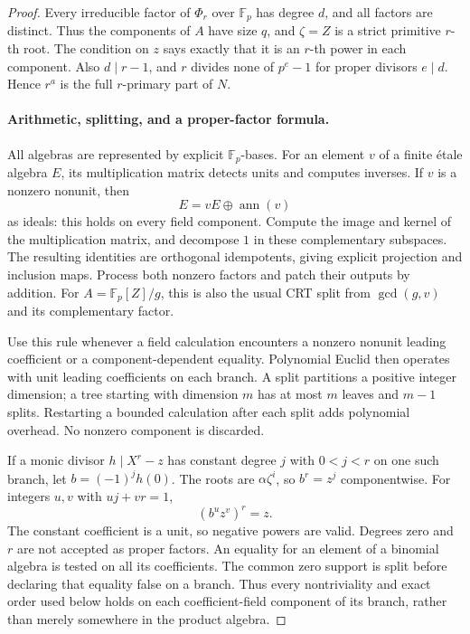 \documentclass[11pt]{article}
\theoremstyle{definition}
\theoremstyle{remark}
\begin{document}
\begin{proof}
Every irreducible factor of \(\Phi_r\) over \(\mathbb F_p\)
has degree \(d\), and all factors are distinct. Thus the components
of \(A\) have size \(q\), and \(\zeta=Z\) is a strict
primitive \(r\)-th root. The condition on \(z\) says exactly that
it is an \(r\)-th power in each component. Also
\(d\mid r-1\), and \(r\) divides none of \(p^e-1\) for
proper divisors \(e\mid d\). Hence \(r^a\) is the full
\(r\)-primary part of \(N\).

\paragraph{Arithmetic, splitting, and a proper-factor formula.}
All algebras are represented by explicit \(\mathbb F_p\)-bases.
For an element \(v\) of a finite \'etale algebra \(E\),
its multiplication matrix detects units and computes inverses.
If \(v\) is a nonzero nonunit, then
\[
                  E=vE\oplus\operatorname{ann}(v)
\]
as ideals: this holds on every field component. Compute the image
and kernel of the multiplication matrix, and decompose \(1\) in
these complementary subspaces. The resulting identities are
orthogonal idempotents, giving explicit projection and inclusion
maps. Process both nonzero factors and patch their outputs by
addition. For \(A=\mathbb F_p[Z]/g\), this is also the usual CRT
split from \(\gcd(g,v)\) and its complementary factor.

Use this rule whenever a field calculation encounters a nonzero
nonunit leading coefficient or a component-dependent equality.
Polynomial Euclid then operates with unit leading coefficients on
each branch. A split partitions a positive integer dimension;
a tree starting with dimension \(m\) has at most \(m\) leaves
and \(m-1\) splits. Restarting a bounded calculation after each
split adds polynomial overhead. No nonzero component is discarded.

If a monic divisor \(h\mid X^r-z\) has constant degree \(j\)
with \(0<j<r\) on one such branch, let \(b=(-1)^jh(0)\).
The roots are \(\alpha\zeta^i\), so \(b^r=z^j\) componentwise.
For integers \(u,v\) with \(uj+vr=1\),
\[
                         (b^u z^v)^r=z.                 \tag{*}
\]
The constant coefficient is a unit, so negative powers are valid.
Degrees zero and \(r\) are not accepted as proper factors.
An equality for an element of a binomial algebra is tested on all
its coefficients. The common zero support is split before declaring
that equality false on a branch. Thus every nontriviality and exact
order used below holds on each coefficient-field component of its
branch, rather than merely somewhere in the product algebra.


\end{proof}
\end{document}
